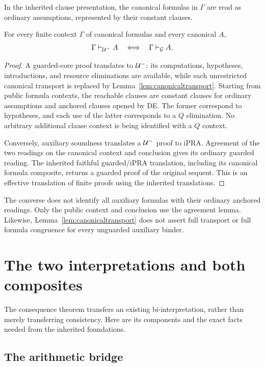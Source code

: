 In the inherited clause presentation, the canonical formulas in $\Gamma$
are read as ordinary assumptions, represented by their constant clauses.

\begin{theorem}
\label{thm:consequence}
For every finite context $\Gamma$ of canonical formulas and every canonical
$A$,
\[
 \Gamma\vdash_{\mathcal U^{-}}A\quad\Longleftrightarrow\quad\Gamma\vdash_{\mathcal G}A.
\]
\end{theorem}
\begin{proof}
A guarded-core proof translates to $\mathcal U^{-}$: its computations,
hypotheses, introductions, and resource eliminations are available, while
each unrestricted canonical transport is replaced by
Lemma~\ref{lem:canonicaltransport}. Starting from public formula contexts,
the reachable clauses are constant clauses for ordinary assumptions and
anchored clauses opened by DE. The former correspond to hypotheses, and
each use of the latter corresponds to a $Q$ elimination. No arbitrary
additional clause context is being identified with a $Q$ context.

Conversely, auxiliary soundness translates a $\mathcal U^{-}$ proof to iPRA.
Agreement of the two readings on the canonical context and conclusion
gives its ordinary guarded reading. The inherited faithful guarded/iPRA
translation, including its canonical formula composite, returns a guarded
proof of the original sequent. This is an effective translation of finite
proofs using the inherited translations.
\end{proof}

The converse does not identify all auxiliary formulas with their ordinary
anchored readings. Only the public context and conclusion use the agreement
lemma. Likewise, Lemma~\ref{lem:canonicaltransport} does not assert full
transport or full formula congruence for every unguarded auxiliary binder.

\section{The two interpretations and both composites}
\label{sec:biinterpretation}

The consequence theorem transfers an existing bi-interpretation, rather
than merely transferring consistency. Here are its components and the
exact facts needed from the inherited foundations.

\subsection{The arithmetic bridge}

